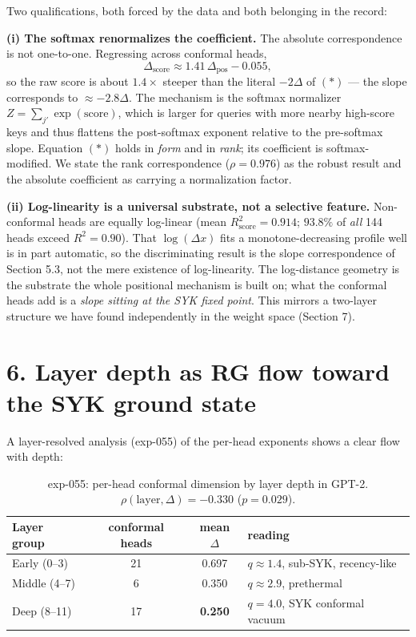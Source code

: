Two qualifications, both forced by the data and both belonging in the
record:

\textbf{(i) The softmax renormalizes the coefficient.} The absolute
correspondence is not one-to-one. Regressing across conformal heads, \[
\Delta_{\text{score}} \approx 1.41\,\Delta_{\text{pos}} - 0.055,
\] so the raw score is about \(1.4\times\) steeper than the literal
\(-2\Delta\) of \((\ast)\) --- the slope corresponds to
\(\approx -2.8\Delta\). The mechanism is the softmax normalizer
\(Z = \sum_{j'}\exp(\text{score})\), which is larger for queries with
more nearby high-score keys and thus flattens the post-softmax exponent
relative to the pre-softmax slope. Equation \((\ast)\) holds in
\emph{form} and in \emph{rank}; its coefficient is softmax-modified. We
state the rank correspondence (\(\rho = 0.976\)) as the robust result
and the absolute coefficient as carrying a normalization factor.

\textbf{(ii) Log-linearity is a universal substrate, not a selective
feature.} Non-conformal heads are equally log-linear (mean
\(R^2_{\text{score}} =
0.914\); \(93.8\%\) of \emph{all} 144 heads exceed \(R^2 = 0.90\)). That
\(\log(\Delta x)\) fits a monotone-decreasing profile well is in part
automatic, so the discriminating result is the slope correspondence of
Section 5.3, not the mere existence of log-linearity. The log-distance
geometry is the substrate the whole positional mechanism is built on;
what the conformal heads add is a \emph{slope sitting at the SYK fixed
point}. This mirrors a two-layer structure we have found independently
in the weight space (Section 7).

\section{6. Layer depth as RG flow toward the SYK ground
state}\label{layer-depth-as-rg-flow-toward-the-syk-ground-state}

A layer-resolved analysis (exp-055) of the per-head exponents shows a
clear flow with depth:

\begin{table}[H]
\centering
\begin{tabular}{lccl}
\toprule
Layer group & conformal heads & mean $\Delta$ & reading \\
\midrule
Early (0--3) & 21 & 0.697 & $q \approx 1.4$, sub-SYK, recency-like \\
Middle (4--7) & 6 & 0.350 & $q \approx 2.9$, prethermal \\
Deep (8--11) & 17 & \textbf{0.250} & $q = 4.0$, SYK conformal vacuum \\
\bottomrule
\end{tabular}
\caption{exp-055: per-head conformal dimension by layer depth in GPT-2.
$\rho(\text{layer}, \Delta) = -0.330$ ($p = 0.029$).}
\end{table}

